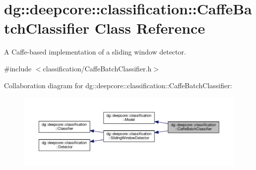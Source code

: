 \hypertarget{classdg_1_1deepcore_1_1classification_1_1_caffe_batch_classifier}{}\section{dg\+:\+:deepcore\+:\+:classification\+:\+:Caffe\+Batch\+Classifier Class Reference}
\label{classdg_1_1deepcore_1_1classification_1_1_caffe_batch_classifier}


A Caffe-\/based implementation of a sliding window detector.  




{\ttfamily \#include $<$classification/\+Caffe\+Batch\+Classifier.\+h$>$}



Collaboration diagram for dg\+:\+:deepcore\+:\+:classification\+:\+:Caffe\+Batch\+Classifier\+:
\nopagebreak
\begin{figure}[H]
\begin{center}
\leavevmode
\includegraphics[width=350pt]{classdg_1_1deepcore_1_1classification_1_1_caffe_batch_classifier__coll__graph}
\end{center}
\end{figure}

